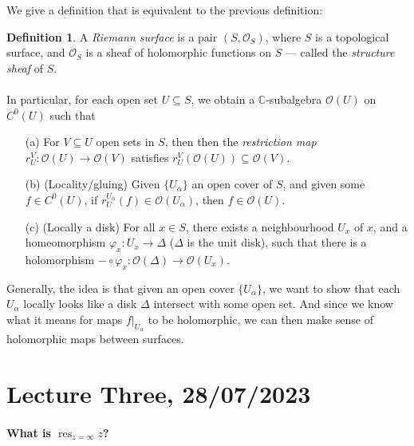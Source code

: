 \documentclass[a4paper]{report}
\theoremstyle{definition}
\newtheorem{definition}{Definition}
\theoremstyle{remark}
\theoremstyle{proposition}
\theoremstyle{conjecture}
\theoremstyle{lemma}
\theoremstyle{corollary}
\theoremstyle{exercise}
\theoremstyle{example}
\newcommand{\C}{\mathbb{C}}
\newcommand{\mcal}{\mathcal}
\newcommand{\on}{\operatorname}
\begin{document}
We give a definition that is equivalent to the previous definition:

\begin{definition}
    A \emph{Riemann surface} is a pair $(S,\mcal{O}_S)$, where $S$ is a 
    topological surface, and $\mcal{O}_S$ is a sheaf of holomorphic functions on 
    $S$ --- called the \emph{structure sheaf} of $S$. \\\\
    In particular, for each open set $U \subseteq S$, we obtain a 
    $\C$-subalgebra $\mcal{O}(U)$ on $C^0(U)$ such that
    \begin{itemize}
        \item[(a)] For $V\subseteq U$ open sets in $S$, then 
            then the \emph{restriction map} 
            $r_U^V:\mcal{O}(U) \to \mcal{O}(V)$ 
            satisfies $r_U^V(\mcal{O}(U)) \subseteq \mcal{O}(V)$. 
        \item[(b)] (Locality/gluing) Given $\lbrace U_\alpha\rbrace$ an
            open cover of $S$, and given some $f \in C^0(U)$, if 
            $r_U^{U_\alpha}(f) \in \mcal{O}(U_\alpha)$, then $f\in\mcal{O}(U)$.
        \item[(c)] (Locally a disk) For all $x \in S$, there exists a 
            neighbourhood $U_x$ of $x$, and a homeomorphism 
            $\varphi_x: U_x \to \Delta$ ($\Delta$ is the unit disk), such that 
            there is a holomorphism 
            $-\circ\varphi_x : \mcal{O}(\Delta) \to \mcal{O}(U_x).$
    \end{itemize}
\end{definition}

Generally, the idea is that given an open cover $\lbrace U_\alpha\rbrace$,
we want to show that each $U_\alpha$ locally looks like a disk $\Delta$ intersect
with some open set. And since we know what it means for maps $f\vert_{U_\alpha}$
to be holomorphic, we can then make sense of holomorphic maps between surfaces.

\section{Lecture Three, 28/07/2023}

\paragraph{What is $\on{res}_{z=\infty}z$?} 
\end{document}
